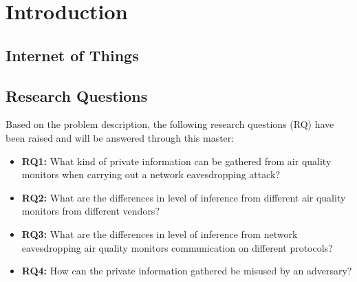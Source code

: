 \chapter*{Introduction}
\section*{Internet of Things}

\section*{}

\section*{}

\section*{Research Questions}

Based on the problem description, the following research questions (RQ) have been raised and will be answered through this master:
\begin{itemize}
    \item 
    \textbf{RQ1:} What kind of private information can be gathered from air quality monitors when carrying out a network eavesdropping attack?\\
    \item 
    \textbf{RQ2:} What are the differences in level of inference from different air quality monitors from different vendors?\\
    \item
    \textbf{RQ3:} What are the differences in level of inference from network eavesdropping air quality monitors communication on different protocols?\\
    \item 
    \textbf{RQ4:} How can the private information gathered be misused by an adversary?\\
\end{itemize}